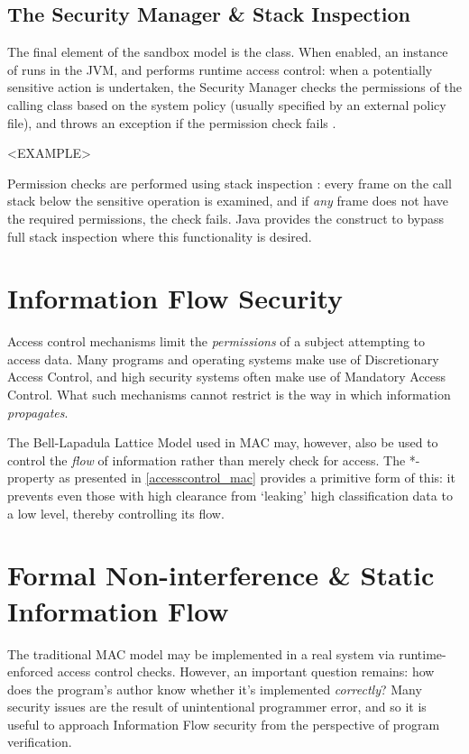 \subsection{The Security Manager \& Stack Inspection}

The final element of the sandbox model is the  class. When enabled, an instance of  runs in the JVM, and performs runtime access control: when a potentially sensitive action is undertaken, the Security Manager checks the permissions of the calling class based on the system policy (usually specified by an external policy file), and throws an exception if the permission check fails \cite{gosling2014java}.

<EXAMPLE>

Permission checks are performed using stack inspection \cite{gong2003javasecurity}: every frame on the call stack below the sensitive operation is examined, and if \textit{any} frame does not have the required permissions, the check fails. Java provides the  construct to bypass full stack inspection \cite{gong2003javasecurity} where this functionality is desired.

\section{Information Flow Security}

Access control mechanisms limit the \textit{permissions} of a subject attempting to access data. Many programs and operating systems make use of Discretionary Access Control, and high security systems often make use of Mandatory Access Control. What such mechanisms cannot restrict is the way in which information \textit{propagates}.

The Bell-Lapadula Lattice Model used in MAC may, however, also be used to control the \textit{flow} of information rather than merely check for access. The *-property as presented in \ref{accesscontrol_mac} provides a primitive form of this: it prevents even those with high clearance from `leaking' high classification data to a low level, thereby controlling its flow.

\section{Formal Non-interference \& Static Information Flow} \label{theory_if_noninterference}

The traditional MAC model may be implemented in a real system via runtime-enforced access control checks. However, an important question remains: how does the program's author know whether it's implemented \textit{correctly}? Many security issues are the result of unintentional programmer error, and so it is useful to approach Information Flow security from the perspective of program verification.

